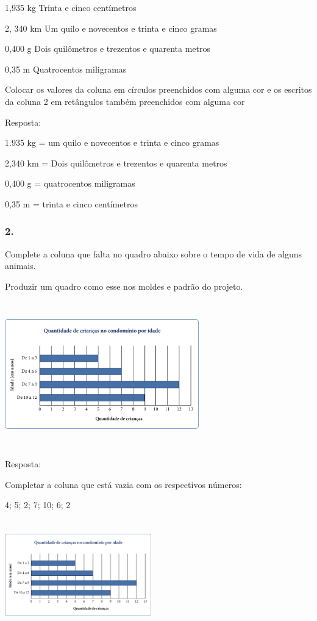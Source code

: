 1,935 kg Trinta e cinco centímetros

2, 340 km Um quilo e novecentos e trinta e cinco gramas

0,400 g Dois quilômetros e trezentos e quarenta metros

0,35 m Quatrocentos miligramas

Colocar os valores da coluna em círculos preenchidos com alguma cor e os
escritos da coluna 2 em retângulos também preenchidos com alguma cor

Resposta:

1.935 kg = um quilo e novecentos e trinta e cinco gramas

2,340 km = Dois quilômetros e trezentos e quarenta metros

0,400 g = quatrocentos miligramas

0,35 m = trinta e cinco centímetros

\subsubsection{2.}\label{section-40}

Complete a coluna que falta no quadro abaixo sobre o tempo de vida de
alguns animais.

Produzir um quadro como esse nos moldes e padrão do projeto.

\includegraphics[width=3.30833in,height=2.49130in]{media/image51.png}

Resposta:

Completar a coluna que está vazia com os respectivos números:

4; 5; 2; 7; 10; 6; 2

\includegraphics[width=2.50000in,height=1.88259in]{media/image51.png}

